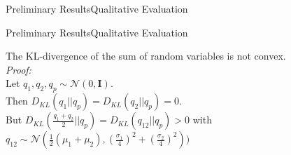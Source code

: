 \begin{frame}{Preliminary Results}{Qualitative Evaluation}
    \begin{figure}
        \centering
    \end{figure}
\end{frame}



\begin{frame}{Preliminary Results}{Qualitative Evaluation}
    \begin{figure}
        \centering
    \end{figure}
\end{frame}



\begin{frame}
    The KL-divergence of the sum of random variables is not convex.\\

    \textit{Proof:}\\
    Let $q_1, q_2, q_p \sim \mathcal{N}(0, \textbf{I})$.\\
    Then $D_{KL}(q_1||q_p) = D_{KL}(q_2||q_p) = 0$.\\
    But $D_{KL}(\frac{q_1 + q_2}{2}||q_p) = D_{KL}(q_{12}||q_p) > 0$ with $q_{12} \sim \mathcal{N}(\frac{1}{2}(\mu_1 + \mu_2), (\frac{\sigma_1}{4})^2+(\frac{\sigma_2}{4})^2))$
\end{frame}